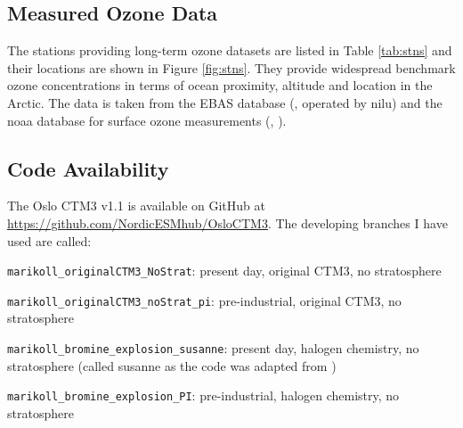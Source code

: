 \subsection{Measured Ozone Data}

The stations providing long-term ozone datasets are listed in Table \ref{tab:stns} and their locations are shown in Figure \ref{fig:stns}. They provide widespread benchmark ozone concentrations in terms of ocean proximity, altitude and location in the Arctic. The data is taken from the EBAS database (\cite{EBAS}, operated by \acrfull{nilu}) and the \acrfull{noaa} database for surface ozone measurements (\cite{NOAA}, \cite{McClure_Begley_NOAA}).




\subsection{Code Availability}\label{sec:code_availability}

The Oslo CTM3 v1.1 is available on GitHub at \url{https://github.com/NordicESMhub/OsloCTM3}. The developing branches I have used are called:


\begin{mydef}\label{def:origCTM3_PD}
    \texttt{marikoll\_originalCTM3\_NoStrat}: present day, original CTM3, no stratosphere
\end{mydef}

\begin{mydef}\label{def:origCTM3_PI} 
    \texttt{marikoll\_originalCTM3\_noStrat\_pi}: pre-industrial, original CTM3, no stratosphere
\end{mydef}
    
\begin{mydef}\label{def:BE_PD}
    \texttt{marikoll\_bromine\_explosion\_susanne}: present day, halogen chemistry, no stratosphere (called susanne as the code was adapted from \cite{Susanne})
\end{mydef}
    
\begin{mydef}\label{def:BE_PI}
    \texttt{marikoll\_bromine\_explosion\_PI}: pre-industrial, halogen chemistry, no stratosphere
\end{mydef}